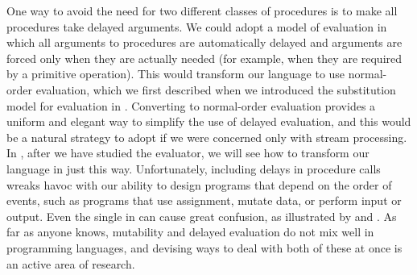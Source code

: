 One way to avoid the need for two different classes of procedures is to make all procedures take delayed arguments.
We could adopt a model of evaluation in which all arguments to procedures are automatically delayed and arguments are forced only when they are actually needed (for example, when they are required by a primitive operation).
This would transform our language to use normal-order evaluation, which we first described when we introduced the substitution model for evaluation in .
Converting to normal-order evaluation provides a uniform and elegant way to simplify the use of delayed evaluation, and this would be a natural strategy to adopt if we were concerned only with stream processing.
In , after we have studied the evaluator, we will see how to transform our language in just this way.
Unfortunately, including delays in procedure calls wreaks havoc with our ability to design programs that depend on the order of events, such as programs that use assignment, mutate data, or perform input or output.
Even the single  in  can cause great confusion, as illustrated by  and .
As far as anyone knows, mutability and delayed evaluation do not mix well in programming languages, and devising ways to deal with both of these at once is an active area of research.
